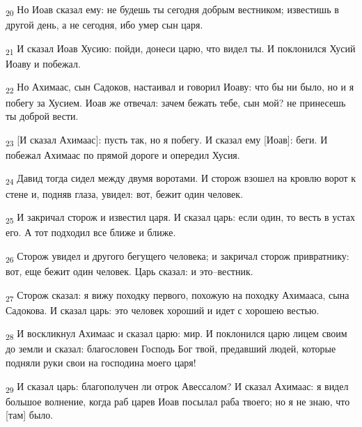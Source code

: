 \begin{tcolorbox}
\textsubscript{20} Но Иоав сказал ему: не будешь ты сегодня добрым вестником; известишь в другой день, а не сегодня, ибо умер сын царя.
\end{tcolorbox}
\begin{tcolorbox}
\textsubscript{21} И сказал Иоав Хусию: пойди, донеси царю, что видел ты. И поклонился Хусий Иоаву и побежал.
\end{tcolorbox}
\begin{tcolorbox}
\textsubscript{22} Но Ахимаас, сын Садоков, настаивал и говорил Иоаву: что бы ни было, но и я побегу за Хусием. Иоав же отвечал: зачем бежать тебе, сын мой? не принесешь ты доброй вести.
\end{tcolorbox}
\begin{tcolorbox}
\textsubscript{23} [И сказал Ахимаас]: пусть так, но я побегу. И сказал ему [Иоав]: беги. И побежал Ахимаас по прямой дороге и опередил Хусия.
\end{tcolorbox}
\begin{tcolorbox}
\textsubscript{24} Давид тогда сидел между двумя воротами. И сторож взошел на кровлю ворот к стене и, подняв глаза, увидел: вот, бежит один человек.
\end{tcolorbox}
\begin{tcolorbox}
\textsubscript{25} И закричал сторож и известил царя. И сказал царь: если один, то весть в устах его. А тот подходил все ближе и ближе.
\end{tcolorbox}
\begin{tcolorbox}
\textsubscript{26} Сторож увидел и другого бегущего человека; и закричал сторож привратнику: вот, еще бежит один человек. Царь сказал: и это--вестник.
\end{tcolorbox}
\begin{tcolorbox}
\textsubscript{27} Сторож сказал: я вижу походку первого, похожую на походку Ахимааса, сына Садокова. И сказал царь: это человек хороший и идет с хорошею вестью.
\end{tcolorbox}
\begin{tcolorbox}
\textsubscript{28} И воскликнул Ахимаас и сказал царю: мир. И поклонился царю лицем своим до земли и сказал: благословен Господь Бог твой, предавший людей, которые подняли руки свои на господина моего царя!
\end{tcolorbox}
\begin{tcolorbox}
\textsubscript{29} И сказал царь: благополучен ли отрок Авессалом? И сказал Ахимаас: я видел большое волнение, когда раб царев Иоав посылал раба твоего; но я не знаю, что [там] было.
\end{tcolorbox}
